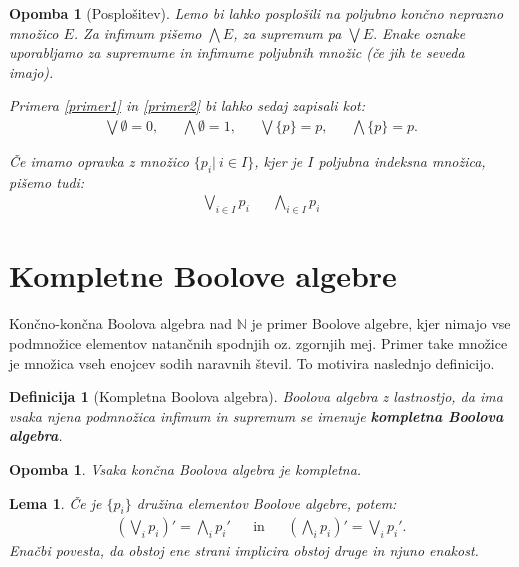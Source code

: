 \documentclass{amsart}
\newcommand{\NN}{\mathbb{N}}
\newtheorem{lema}[izrek]{Lema}
\newtheorem{definicija}[izrek]{Definicija}
\newtheorem{opomba}[izrek]{Opomba}
\begin{document}
\begin{opomba}[Posplošitev]
    Lemo bi lahko posplošili na poljubno končno neprazno množico \(E\). Za infimum pišemo \(\bigwedge E\), za supremum pa
    \(\bigvee E.\) Enake oznake uporabljamo za supremume in infimume poljubnih množic (če jih te seveda imajo).

    Primera \ref{primer1} in \ref{primer2} bi lahko sedaj zapisali kot:
    \begin{align*}
        \bigvee \emptyset = 0, && \bigwedge \emptyset = 1, && \bigvee \{p\} = p, && \bigwedge \{p\} = p.
    \end{align*}

    Če imamo opravka z množico \(\{p_i|~i \in I\}\), kjer je $I$ poljubna indeksna množica, pišemo tudi:
    \begin{align*}
        \bigvee_{i \in I} p_i && \bigwedge_{i \in I} p_i
    \end{align*}
\end{opomba}

\section{Kompletne Boolove algebre}

Končno-končna Boolova algebra nad \(\NN\) je primer Boolove algebre, kjer nimajo vse podmnožice elementov
natančnih spodnjih oz. zgornjih mej. Primer take množice je množica vseh enojcev sodih naravnih števil. To motivira naslednjo definicijo.

\begin{definicija}[Kompletna Boolova algebra]
    Boolova algebra z lastnostjo, da ima vsaka njena podmnožica infimum in supremum se imenuje {\bf kompletna
    Boolova algebra}.
\end{definicija}


\begin{opomba}
    Vsaka končna Boolova algebra je kompletna.
\end{opomba}

\begin{lema}
    Če je \(\{p_i\}\) družina elementov Boolove algebre, potem:
    \begin{align*}
        \left(\bigvee_{i} p_i\right)' = \bigwedge_{i} p_i' &&\text{in} && \left(\bigwedge_{i} p_i\right)' = \bigvee_{i} p_i'.
    \end{align*}
    Enačbi povesta, da obstoj ene strani implicira obstoj druge in njuno enakost.
\end{lema}
\end{document}
